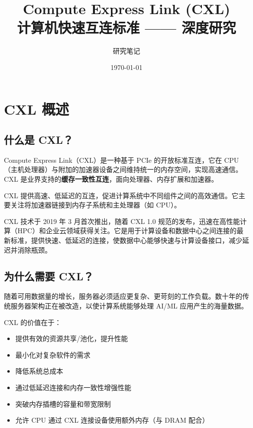 \documentclass[12pt,a4paper]{article}
\title{\textbf{Compute Express Link (CXL)\\ 计算机快速互连标准 —— 深度研究}}
\author{研究笔记}
\date{\today}
\begin{document}
\maketitle
\tableofcontents
\newpage

\section{CXL 概述}

\subsection{什么是 CXL？}

Compute Express Link（CXL）是一种基于 PCIe 的开放标准互连，它在 CPU（主机处理器）与附加的加速器设备之间维持统一的内存空间，实现高速通信。CXL 是业界支持的\textbf{缓存一致性互连}，面向处理器、内存扩展和加速器。

\begin{keypoint}[核心定义]
CXL 提供高速、低延迟的互连，促进计算系统中不同组件之间的高效通信。它主要关注将加速器链接到内存子系统和主处理器（如 CPU）。
\end{keypoint}

\begin{transbox}
CXL 技术于 2019 年 3 月首次推出，随着 CXL 1.0 规范的发布，迅速在高性能计算（HPC）和企业云领域获得关注。它是用于计算设备和数据中心之间连接的最新标准，提供快速、低延迟的连接，使数据中心能够快速与计算设备接口，减少延迟并消除瓶颈。
\end{transbox}

\subsection{为什么需要 CXL？}

随着可用数据量的增长，服务器必须适应更复杂、更苛刻的工作负载。数十年的传统服务器架构正在被改造，以使计算系统能够处理 AI/ML 应用产生的海量数据。

CXL 的价值在于：
\begin{itemize}
    \item 提供有效的资源共享/池化，提升性能
    \item 最小化对复杂软件的需求
    \item 降低系统总成本
    \item 通过低延迟连接和内存一致性增强性能
    \item 突破内存插槽的容量和带宽限制
    \item 允许 CPU 通过 CXL 连接设备使用额外内存（与 DRAM 配合）
\end{itemize}
\end{document}
